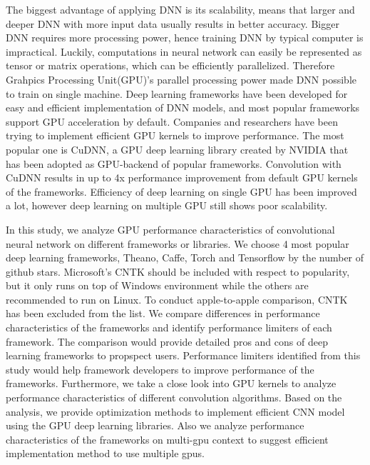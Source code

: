 \documentclass[conference]{IEEEtran}
\begin{document}
The biggest advantage of applying DNN is its scalability, means that larger and deeper DNN with more input data usually results in better accuracy.
Bigger DNN requires more processing power, hence training DNN by typical computer is impractical.
Luckily, computations in neural network can easily be represented as tensor or matrix operations, which can be efficiently parallelized.
Therefore Grahpics Processing Unit(GPU)'s parallel processing power made DNN possible to train on single machine.
Deep learning frameworks have been developed for easy and efficient implementation of DNN models, and most popular frameworks support GPU acceleration by default.
\cite{} %
Companies and researchers have been trying to implement efficient GPU kernels to improve performance.
\cite{} %
The most popular one is CuDNN, a GPU deep learning library created by NVIDIA that has been adopted as GPU-backend of popular frameworks.
\cite{} %
Convolution with CuDNN results in up to 4x performance improvement from default GPU kernels of the frameworks.
\cite{} %
Efficiency of deep learning on single GPU has been improved a lot, however deep learning on multiple GPU still shows poor scalability.
\cite{} %

In this study, we analyze GPU performance characteristics of convolutional neural network on different frameworks or libraries.
We choose 4 most popular deep learning frameworks, Theano, Caffe, Torch and Tensorflow by the number of github stars.
Microsoft's CNTK should be included with respect to popularity, but it only runs on top of Windows environment while the others are recommended to run on Linux.
To conduct apple-to-apple comparison, CNTK has been excluded from the list.
We compare differences in performance characteristics of the frameworks and identify performance limiters of each framework.
The comparison would provide detailed pros and cons of deep learning frameworks to propspect users.
Performance limiters identified from this study would help framework developers to improve performance of the frameworks.
Furthermore, we take a close look into GPU kernels to analyze performance characteristics of different convolution algorithms.
Based on the analysis, we provide optimization methods to implement efficient CNN model using the GPU deep learning libraries.
Also we analyze performance characteristics of the frameworks on multi-gpu context to suggest efficient implementation method to use multiple gpus.
\end{document}
